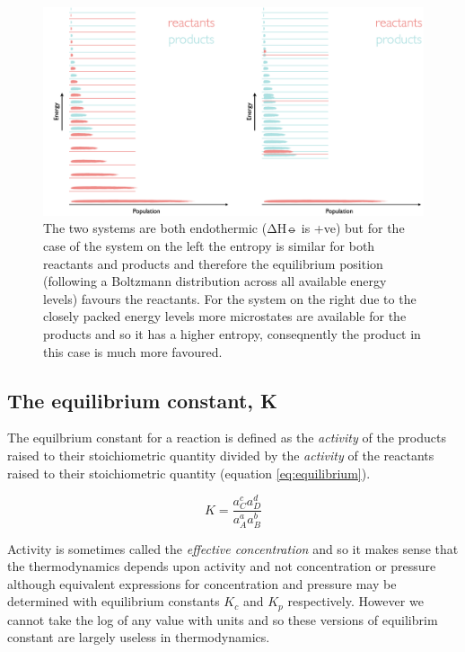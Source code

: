 \documentclass[
]{book}
\begin{document}
\begin{figure}

{\centering \includegraphics[width=1\linewidth]{images/energyleveleq} 

}

\caption{The two systems are both endothermic (ΔH⦵ is +ve) but for the case of the system on the left the entropy is similar for both reactants and products and therefore the equilibrium position (following a Boltzmann distribution across all available energy levels) favours the reactants. For the system on the right due to the closely packed energy levels more microstates are available for the products and so it has a higher entropy, conseqnently the product in this case is much more favoured.}\label{fig:energyleveleq}
\end{figure}

\hypertarget{the-equilibrium-constant-k}{%
\subsection{The equilibrium constant, K}\label{the-equilibrium-constant-k}}

The equilbrium constant for a reaction is defined as the \emph{activity} of the products raised to their stoichiometric quantity divided by the \emph{activity} of the reactants raised to their stoichiometric quantity (equation \eqref{eq:equilibrium}).

\begin{equation}
K = \frac{a_C^ca_D^d}{a_A^aa_B^b}
\label{eq:equilibrium}
\end{equation}

Activity is sometimes called the \emph{effective concentration} and so it makes sense that the thermodynamics depends upon activity and not concentration or pressure although equivalent expressions for concentration and pressure may be determined with equilibrium constants \(K_c\) and \(K_p\) respectively. However we cannot take the log of any value with units and so these versions of equilibrim constant are largely useless in thermodynamics.
\end{document}
